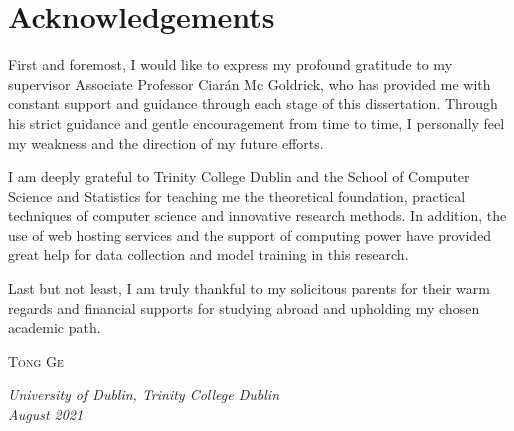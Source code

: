 \chapter{Acknowledgements}
{
\linespread{1.3}
\selectfont
First and foremost, I would like to express my profound gratitude to my supervisor Associate Professor Ciarán Mc Goldrick, who has provided me with constant support and guidance through each stage of this dissertation. Through his strict guidance and gentle encouragement from time to time, I personally feel my weakness and the direction of my future efforts.

I am deeply grateful to Trinity College Dublin and the School of Computer Science and Statistics for teaching me the theoretical foundation, practical techniques of computer science and innovative research methods. In addition, the use of web hosting services and the support of computing power have provided great help for data collection and model training in this research.

Last but not least, I am truly thankful to my solicitous parents for their warm regards and financial supports for studying abroad and upholding my chosen academic path.

\vspace{1.2cm}
\raggedleft \textsc{\large Tong Ge} \\[10mm]

\raggedright \textit{University of Dublin, Trinity College Dublin \\
August 2021}
}
\clearpage